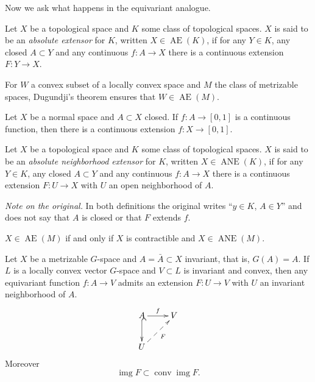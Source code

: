 Now we ask what happens in the
equivariant analogue.

\begin{definition}
\label{definition-absolute-extensor}
Let $X$ be a topological space and $K$
some class of topological spaces. $X$
is said to be an
{\it absolute extensor} for $K$,
written $X\in\operatorname{AE}(K)$, if
for any $Y\in K$, any closed
$A\subset Y$ and any continuous
$f:A\to X$ there is a continuous
extension $F:Y\to X$.
\end{definition}

\begin{example}
\label{example-convex-absolute-extensor}
For $W$ a convex subset of a locally
convex space and $M$ the class of
metrizable spaces, Dugundji's theorem
ensures that
$W\in\operatorname{AE}(M)$.
\end{example}

\begin{theorem}[Tietze]
\label{theorem-tietze}
Let $X$ be a normal space and
$A\subset X$ closed. If
$f:A\to[0,1]$ is a continuous function,
then there is a continuous extension
$f:X\to[0,1]$.
\end{theorem}

\begin{definition}
\label{definition-neighborhood-extensor}
Let $X$ be a topological space and $K$
some class of topological spaces. $X$
is said to be an
{\it absolute neighborhood extensor}
for $K$, written
$X\in\operatorname{ANE}(K)$, if for any
$Y\in K$, any closed $A\subset Y$ and
any continuous $f:A\to X$ there is a
continuous extension $F:U\to X$ with
$U$ an open neighborhood of $A$.
\end{definition}

\noindent
{\it Note on the original.} In both
definitions the original writes
``$y\in K$, $A\in Y$'' and does not say
that $A$ is closed or that $F$ extends
$f$.

\begin{theorem}
\label{theorem-ae-iff-contractible-ane}
$X\in\operatorname{AE}(M)$ if and only
if $X$ is contractible and
$X\in\operatorname{ANE}(M)$.
\end{theorem}

\begin{theorem}
\label{theorem-equivariant-dugundji}
Let $X$ be a metrizable $G$-space and
$A=\bar{A}\subset X$ invariant, that
is, $G(A)=A$. If $L$ is a locally
convex vector $G$-space and
$V\subset L$ is invariant and convex,
then any equivariant function
$f:A\to V$ admits an extension
$F:U\to V$ with $U$ an invariant
neighborhood of $A$.
$$
\xymatrix{
A \ar[r]^-{f} \ar@{^{(}->}[d]
  & V \\
U \ar@{-->}[ur]_{F}
}
$$
Moreover
$$
\operatorname{img}F
\subset\operatorname{conv}
\operatorname{img}F.
$$
\end{theorem}

